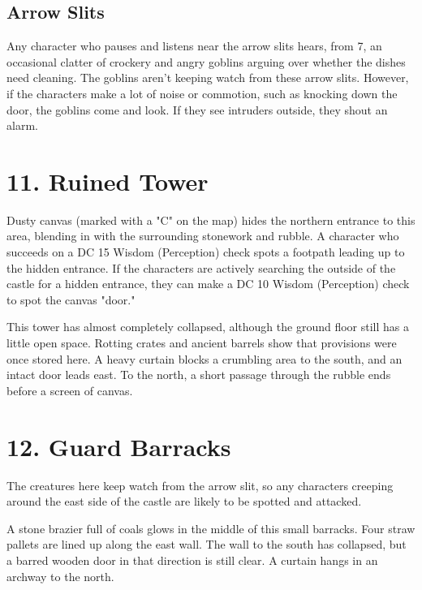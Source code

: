 \documentclass[10pt,a4paper,twoside,bg=print,twocolumn,openany,nodeprecatedcode]{dndbook}
\begin{document}
\subsection{Arrow Slits}
Any character who pauses and listens near the arrow slits hears, from 7, an occasional clatter of crockery and angry goblins arguing over whether the dishes need cleaning. The goblins aren't keeping watch from these arrow slits. However, if the characters make a lot of noise or commotion, such as knocking down the door, the goblins come and look. If they see intruders outside, they shout an alarm.

\section{11. Ruined Tower}
Dusty canvas (marked with a "C" on the map) hides the northern entrance to this area, blending in with the surrounding stonework and rubble. A character who succeeds on a DC 15 Wisdom (Perception) check spots a footpath leading up to the hidden entrance. If the characters are actively searching the outside of the castle for a hidden entrance, they can make a DC 10 Wisdom (Perception) check to spot the canvas "door."

\begin{DndReadAloud}{}
This tower has almost completely collapsed, although the ground floor still has a little open space. Rotting crates and ancient barrels show that provisions were once stored here. A heavy curtain blocks a crumbling area to the south, and an intact door leads east. To the north, a short passage through the rubble ends before a screen of canvas.

\end{DndReadAloud}

\section{12. Guard Barracks}
The creatures here keep watch from the arrow slit, so any characters creeping around the east side of the castle are likely to be spotted and attacked.

\begin{DndReadAloud}{}
A stone brazier full of coals glows in the middle of this small barracks. Four straw pallets are lined up along the east wall. The wall to the south has collapsed, but a barred wooden door in that direction is still clear. A curtain hangs in an archway to the north.

\end{DndReadAloud}
\end{document}
